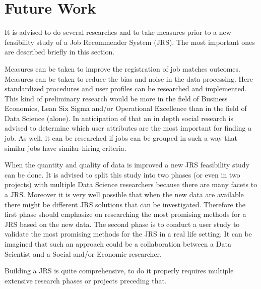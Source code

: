\section{Future Work}
\label{sec:fut}

It is advised to do several researches and to take measures prior to a new feasibility study of a Job Recommender System (JRS).
The most important ones are described briefly in this section.

Measures can be taken to improve the registration of job matches outcomes.
Measures can be taken to reduce the bias and noise in the data processing.
Here standardized procedures and user profiles can be researched and implemented.
This kind of preliminary research would be more in the field of Business Economics, Lean Six Sigma and/or Operational Excellence than in the field of Data Science (alone).
In anticipation of that an in depth social research is advised to determine which user attributes are the most important for finding a job.
As well, it can be researched if jobs can be grouped in such a way that similar jobs have similar hiring criteria.

When the quantity and quality of data is improved a new JRS feasibility study can be done.
It is advised to split this study into two phases (or even in two  projects) with multiple Data Science researchers because there are many facets to a JRS. 
Moreover it is very well possible that when the new data are available there might be different JRS solutions that can be investigated.
Therefore the first phase should emphasize on researching the most promising methods for a JRS based on the new data.
The second phase is to conduct a user study to validate the most promising methods for the JRS in a real life setting.
It can be imagined that such an approach could be a collaboration between a Data Scientist and a Social and/or Economic researcher.  

Building a JRS is quite comprehensive, to do it properly requires multiple extensive research phases or projects preceding that.

